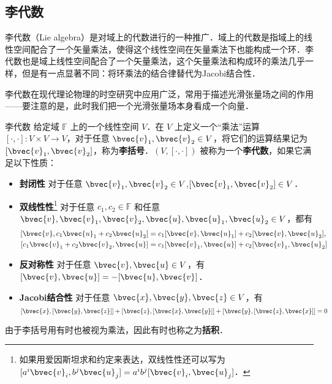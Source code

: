 

\subsection{李代数}

李代数（Lie algebra）是对域上的代数进行的一种推广．域上的代数是指域上的线性空间配合了一个矢量乘法，使得这个线性空间在矢量乘法下也能构成一个环．李代数也是域上线性空间配合了一个矢量乘法，这个矢量乘法和构成环的乘法几乎一样，但是有一点显著不同：将环乘法的结合律替代为Jacobi结合性．

李代数在现代理论物理的时空研究中应用广泛，常用于描述光滑张量场之间的作用——要注意的是，此时我们把一个光滑张量场本身看成一个向量．

\begin{definition}{李代数}\label{LieAlg_def2}
给定域 $\mathbb{F}$ 上的一个线性空间 $V$．在 $V$ 上定义一个“乘法”运算 $[\cdot, \cdot] : V \times V \to V$，对于任意 $\bvec{v}_1, \bvec{v}_2\in V$，将它们的运算结果记为 $[\bvec{v}_1, \bvec{v}_2]$，称为\textbf{李括号}．$(V, [\cdot, \cdot])$ 被称为一个\textbf{李代数}，如果它满足以下性质：

\begin{itemize}
\item \textbf{封闭性} 对于任意 $\bvec{v}_1, \bvec{v}_2\in V$,$[\bvec{v}_1, \bvec{v}_2]\in V$．%

\item \textbf{双线性性}\footnote{如果用爱因斯坦求和约定来表达，双线性性还可以写为 $[a^i\bvec{v}_i, b^j\bvec{u}_j] = a^i b^j[\bvec{v}_i, \bvec{u}_j]$．} 对于任意 $c_1, c_2 \in \mathbb{F}$ 和任意 $\bvec{v}, \bvec{v}_1, \bvec{v}_2, \bvec{u}, \bvec{u}_1, \bvec{u}_2 \in V$，都有 
$$\begin{aligned}
{[\bvec{v}, c_1\bvec{u}_1 + c_2\bvec{u}_2]} &= c_1 [\bvec{v}, \bvec{u}_1] + c_2[\bvec{v}, \bvec{u}_2], \\
[c_1\bvec{v}_1+c_2\bvec{v}_2, \bvec{u}] &= c_1[\bvec{v}_1, \bvec{u}] + c_2[\bvec{v}_1, \bvec{u}_2]
\end{aligned}$$

\item \textbf{反对称性} 对于任意 $\bvec{v}, \bvec{u}\in V$，有 $[\bvec{v}, \bvec{u}]=-[\bvec{u}, \bvec{v}]$．

\item \textbf{Jacobi结合性} 对于任意 $\bvec{x}, \bvec{y}, \bvec{z}\in V$，有
$$
[\bvec{x}, [\bvec{y}, \bvec{z}]]+[\bvec{z}, [\bvec{x}, \bvec{y}]]+[\bvec{y}, [\bvec{z}, \bvec{x}]]=0
$$
\end{itemize}

由于李括号用有时也被视为乘法，因此有时也称之为\textbf{括积}．
\end{definition}

